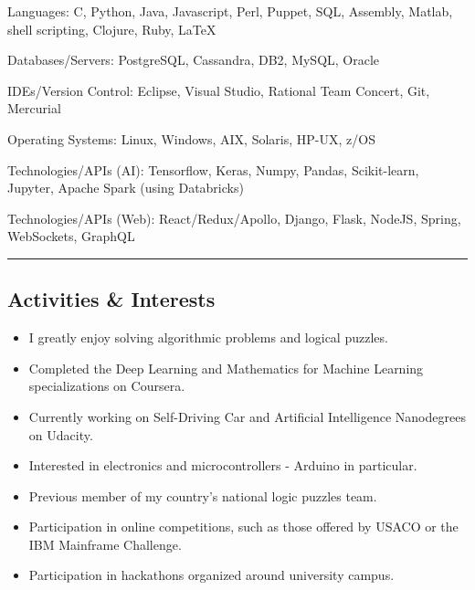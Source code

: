 \documentclass[10pt,letterpaper]{article}
\newenvironment{indentsection}[1]%
{\begin{list}{}%
    {\setlength{\leftmargin}{#1}}%
    \item[]%
}
{\end{list}}
\begin{document}
\begin{indentsection}{\parindent}
\begin{description*}
    \item[Languages:]
    C, Python, Java, Javascript, Perl, Puppet, SQL, Assembly, Matlab, shell scripting, Clojure, Ruby, \LaTeX
    \item[Databases/Servers:]
    PostgreSQL, Cassandra, DB2, MySQL, Oracle
    \item[IDEs/Version Control:]
    Eclipse, Visual Studio, Rational Team Concert, Git, Mercurial
    \item[Operating Systems:]
    Linux, Windows, AIX, Solaris, HP-UX, z/OS
    \item[Technologies/APIs (AI):] Tensorflow, Keras, Numpy, Pandas, Scikit-learn, Jupyter, Apache Spark (using Databricks)
    \item[Technologies/APIs (Web):] React/Redux/Apollo, Django, Flask, NodeJS, Spring, WebSockets, GraphQL

\end{description*}
\end{indentsection}

\hrule
\vspace{-0.4em}
\subsection*{Activities \& Interests}

\begin{itemize}
    \parskip=0.1em

    \item I greatly enjoy solving algorithmic problems and logical puzzles.
    \item Completed the Deep Learning and Mathematics for Machine Learning specializations on Coursera.
    \item Currently working on Self-Driving Car and Artificial Intelligence Nanodegrees on Udacity.
    \item Interested in electronics and microcontrollers - Arduino in particular.
    \item Previous member of my country's national logic puzzles team.
    \item Participation in online competitions, such as those offered by USACO or the IBM Mainframe Challenge.
    \item Participation in hackathons organized around university campus.

\end{itemize}
\end{document}

